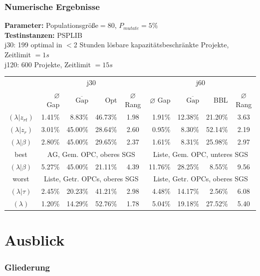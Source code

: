 \begin{frame}[t]
\frametitle{Numerische Ergebnisse}
\begin{footnotesize}
\textbf{Parameter:} Populationsgröße$=80$, $P_{mutate}=5\%$\\
\textbf{Testinstanzen:} PSPLIB\\
j30: 199 optimal in $<$2 Stunden lösbare kapazitätsbeschränkte Projekte, Zeitlimit $=1s$\\
j120: 600 Projekte, Zeitlimit $=15s$

\begin{center}	
\tabcolsep=0.16cm
\begin{tabular}{|c|rrrc|rrrc|}
	\hline
	& \multicolumn{4}{c|}{j30} & \multicolumn{4}{c|}{j60}\\
	 & $\varnothing$ Gap & $\overline{\mbox{Gap}}$ & Opt & $\varnothing$ Rang & $\varnothing$ Gap & $\overline{\mbox{Gap}}$ & BBL & $\varnothing$ Rang \\[3pt]
	\hline
   $(\lambda|z_{rt})$&1.41\%&8.83\%&46.73\%&1.98&1.91\%&12.38\%&21.20\%&3.63\\
	\hline
   $(\lambda|z_r)$&3.01\%&45.00\%&28.64\%&2.60&0.95\%&8.30\%&52.14\%&2.19\\
	\hline
	$(\lambda|\beta)$&2.80\%&45.00\%&29.65\%&2.37&1.61\%&8.31\%&25.98\%&2.97\\
	best & \multicolumn{4}{c|}{AG, Gem. OPC, oberes SGS} & \multicolumn{4}{c|}{Liste, Gem. OPC, unteres SGS}\\
	\hline
	$(\lambda|\beta)$&5.27\%&45.00\%&21.11\%&4.39&11.76\%&28.25\%&8.55\%&9.56\\
	worst & \multicolumn{4}{c|}{Liste, Getr. OPCs, oberes SGS} & \multicolumn{4}{c|}{Liste, Getr. OPCs, oberes SGS}\\
	\hline
	$(\lambda|\tau)$&2.45\%&20.23\%&41.21\%&2.98&4.48\%&14.17\%&2.56\%&6.08\\
	\hline
	$(\lambda)$&1.20\%&14.29\%&52.76\%&1.78&5.04\%&19.18\%&27.52\%&5.40\\
	\hline
\end{tabular}
\end{center}

\end{footnotesize}	

\end{frame}

\section{Ausblick}

\begin{frame}
\frametitle{Gliederung}
\tableofcontents[current] %
\end{frame}

